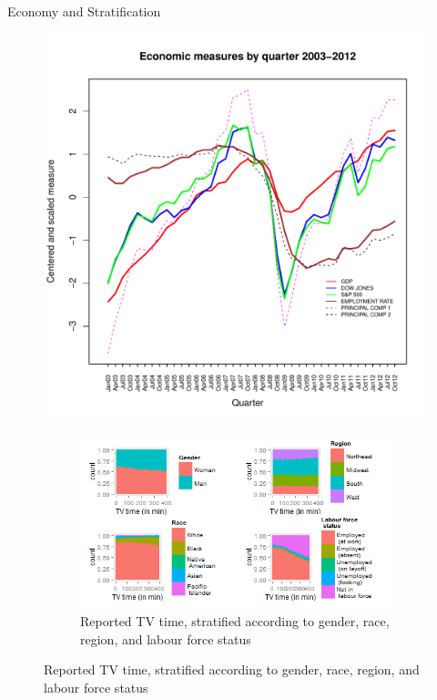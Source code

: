 \documentclass[final]{beamer}
\newcounter{acolumn}%
\begin{document}
\begin{frame}
\begin{acolumns}[t]
\begin{column}{.48\linewidth}
\begin{block}{Economy and Stratification}
\begin{figure}
                 \begin{minipage}{0.5\textwidth}
                 \centering
                 \includegraphics[width=.75\textwidth]{econ_measures.pdf}
                 \end{minipage}%
                 \begin{minipage}{0.5\textwidth}
                 \centering
                 \begin{figure}
                 \includegraphics[height=0.25\textheight,width=\textwidth]{stratification}
                 \caption{Reported TV time, stratified according to gender, race, region, and labour force status}
                 \end{figure}
                 \end{minipage}%
                 \end{figure}
                                 

\end{block}
\end{column}
\end{acolumns}
\end{frame}
\end{document}
